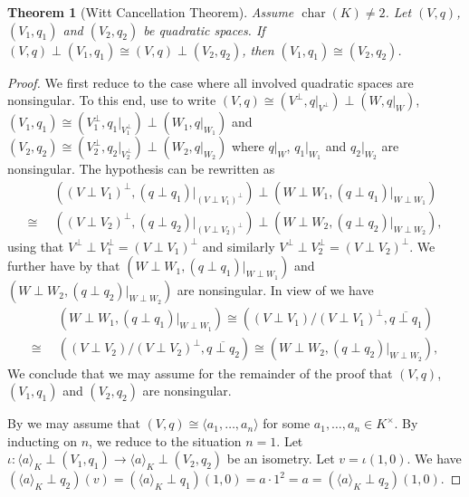 \documentclass[12pt, leqno, british]{amsart}
\theoremstyle{definition}
\theoremstyle{plain}
\newtheorem{thm}[defi]{Theorem}
\theoremstyle{remark}
\DeclareMathOperator{\charac}{char}
\begin{document}
\begin{thm}[Witt Cancellation Theorem]\label{T:Witt-Cancellation}
Assume $\charac(K) \neq 2$.
Let $(V, q)$, $(V_1, q_1)$ and $(V_2, q_2)$ be quadratic spaces.
If $(V, q) \perp (V_1, q_1) \cong (V, q) \perp (V_2, q_2)$, then $(V_1, q_1) \cong (V_2, q_2)$.
\end{thm}
\begin{proof}
We first reduce to the case where all involved quadratic spaces are nonsingular.
To this end, use  to write $(V, q) \cong (V^\perp, q\vert_{V^\perp}) \perp (W, q\vert_W)$, $(V_1, q_1) \cong (V_1^\perp, q_1\vert_{V_1^\perp}) \perp (W_1, q\vert_{W_1})$ and $(V_2, q_2) \cong (V_2^\perp, q_2\vert_{V_2^\perp}) \perp (W_2, q\vert_{W_2})$ where $q\vert_W$, $q_1\vert_{W_1}$ and $q_2\vert_{W_2}$ are nonsingular.
The hypothesis can be rewritten as
\begin{align*}
&((V \perp V_1)^\perp, (q \perp q_1)\vert_{(V \perp V_1)^\perp}) \perp (W \perp W_1, (q \perp q_1)\vert_{W \perp W_1}) \\
\cong\enspace &((V \perp V_2)^\perp, (q \perp q_2)\vert_{(V \perp V_2)^\perp}) \perp (W \perp W_2, (q \perp q_2)\vert_{W \perp W_2}),
\end{align*}
using that $V^\perp \perp V_1^\perp = (V \perp V_1)^\perp$ and similarly $V^\perp \perp V_2^\perp = (V \perp V_2)^\perp$.
We further have by  that $(W \perp W_1, (q \perp q_1)\vert_{W \perp W_1})$ and $(W \perp W_2, (q \perp q_2)\vert_{W \perp W_2})$ are nonsingular.
In view of  we have
\begin{align*}
&(W \perp W_1, (q \perp q_1)\vert_{W \perp W_1}) \cong ((V \perp V_1)/(V \perp V_1)^\perp, \overline{q \perp q_1}) \\
\cong\enspace &((V \perp V_2)/(V \perp V_2)^\perp, \overline{q \perp q_2}) \cong (W \perp W_2, (q \perp q_2)\vert_{W \perp W_2}),
\end{align*}
We conclude that we may assume for the remainder of the proof that $(V, q)$, $(V_1, q_1)$ and $(V_2, q_2)$ are nonsingular.

By  we may assume that $(V, q) \cong \langle a_1, \ldots, a_n \rangle$ for some $a_1, \ldots, a_n \in K^\times$.
By inducting on $n$, we reduce to the situation $n = 1$.
Let $\iota : \langle a \rangle_K \perp (V_1, q_1) \to \langle a \rangle_K \perp (V_2, q_2)$ be an isometry.
Let $v = \iota(1, 0)$.
We have $(\langle a \rangle_K \perp q_2)(v) = (\langle a \rangle_K \perp q_1)(1 , 0) = a\cdot 1^2 = a = (\langle a \rangle_K \perp q_2)(1, 0)$.


\end{proof}
\end{document}
